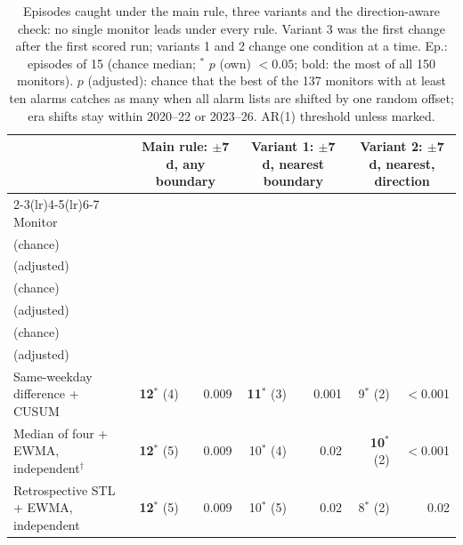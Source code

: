 {\footnotesize\setlength{\tabcolsep}{1.5pt}
\begin{longtable}{@{}lrrrrrr@{}}
\caption{Episodes caught under the main rule, three variants and the direction-aware check: no single monitor leads under every rule. Variant 3 was the first change after the first scored run; variants 1 and 2 change one condition at a time. Ep.: episodes of 15 (chance median; $^{*}$ $p$ (own) $<0.05$; bold: the most of all 150 monitors). $p$ (adjusted): chance that the best of the 137 monitors with at least ten alarms catches as many when all alarm lists are shifted by one random offset; era shifts stay within 2020--22 or 2023--26. AR(1) threshold unless marked.}\label{tab:rule-variants}\\
\toprule
 & \multicolumn{2}{c}{\parbox[b]{2.7cm}{\centering Main rule: $\pm$7 d, any boundary}} & \multicolumn{2}{c}{\parbox[b]{2.7cm}{\centering Variant 1: $\pm$7 d, nearest boundary}} & \multicolumn{2}{c}{\parbox[b]{2.7cm}{\centering Variant 2: $\pm$7 d, nearest, direction}} \\
\cmidrule(lr){2-3}\cmidrule(lr){4-5}\cmidrule(lr){6-7}
Monitor & \begin{tabular}[b]{@{}c@{}}Ep.\\(chance)\end{tabular} & \begin{tabular}[b]{@{}c@{}}$p$\\(adjusted)\end{tabular} & \begin{tabular}[b]{@{}c@{}}Ep.\\(chance)\end{tabular} & \begin{tabular}[b]{@{}c@{}}$p$\\(adjusted)\end{tabular} & \begin{tabular}[b]{@{}c@{}}Ep.\\(chance)\end{tabular} & \begin{tabular}[b]{@{}c@{}}$p$\\(adjusted)\end{tabular} \\
\midrule
Same-weekday difference + CUSUM & \textbf{12$^{*}$} (4) & 0.009 & \textbf{11$^{*}$} (3) & 0.001 & 9$^{*}$ (2) & $<$0.001 \\
Median of four + EWMA, independent$^{\dagger}$ & \textbf{12$^{*}$} (5) & 0.009 & 10$^{*}$ (4) & 0.02 & \textbf{10$^{*}$} (2) & $<$0.001 \\
Retrospective STL + EWMA, independent & \textbf{12$^{*}$} (5) & 0.009 & 10$^{*}$ (5) & 0.02 & 8$^{*}$ (2) & 0.02 \\

\end{longtable}}
